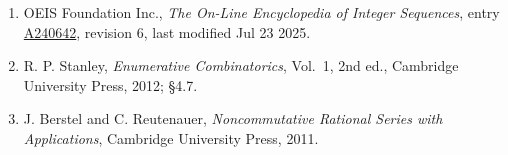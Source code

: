 \documentclass[11pt]{article}
\theoremstyle{definition}
\begin{document}
\begin{enumerate}

\item OEIS Foundation Inc., \emph{The On-Line Encyclopedia of Integer Sequences}, entry \href{https://oeis.org/A240642}{A240642}, revision 6, last modified Jul 23 2025.

\item R. P. Stanley, \emph{Enumerative Combinatorics}, Vol.~1, 2nd ed., Cambridge University Press, 2012; \S4.7.

\item J. Berstel and C. Reutenauer, \emph{Noncommutative Rational Series with Applications}, Cambridge University Press, 2011.

\end{enumerate}
\end{document}
